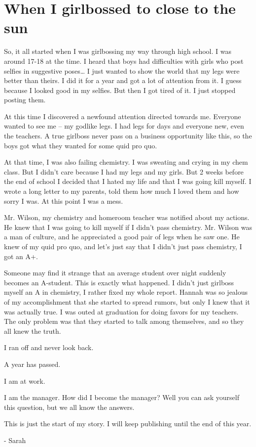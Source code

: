 \documentclass[../thesis.tex]{subfiles}
\begin{document}
    \section{When I girlbossed to close to the sun}

    So, it all started when I was girlbossing my way through high school. I was around 17-18 at the time. I heard that boys had difficulties with girls who post selfies in suggestive poses… I just wanted to show the world that my legs were better than theirs. I did it for a year and got a lot of attention from it. I guess because I looked good in my selfies. But then I got tired of it. I just stopped posting them.

    At this time I discovered a newfound attention directed towards me. Everyone wanted to see me – my godlike legs. I had legs for days and everyone new, even the teachers. A true girlboss never pass on a business opportunity like this, so the boys got what they wanted for some quid pro quo.

    At that time, I was also failing chemistry. I was sweating and crying in my chem class. But I didn’t care because I had my legs and my girls. But 2 weeks before the end of school I decided that I hated my life and that I was going kill myself. I wrote a long letter to my parents, told them how much I loved them and how sorry I was. At this point I was a mess.

    Mr. Wilson, my chemistry and homeroom teacher was notified about my actions. He knew that I was going to kill myself if I didn't pass chemistry. Mr. Wilson was a man of culture, and he appreciated a good pair of legs when he saw one. He knew of my quid pro quo, and let's just say that I didn't just pass chemistry, I got an A+.

    Someone may find it strange that an average student over night suddenly becomes an A-student. This is exactly what happened. I didn't just girlboss myself an A in chemistry, I rather fixed my whole report. Hannah was so jealous of my accomplishment that she started to spread rumors, but only I knew that it was actually true. I was outed at graduation for doing favors for my teachers. The only problem was that they started to talk among themselves, and so they all knew the truth.

    I ran off and never look back. 

    A year has passed.

    I am at work.

    I am the manager. How did I become the manager? Well you can ask yourself this question, but we all know the answers. 

    This is just the start of my story. I will keep publishing until the end of this year.

    - Sarah
\end{document}
